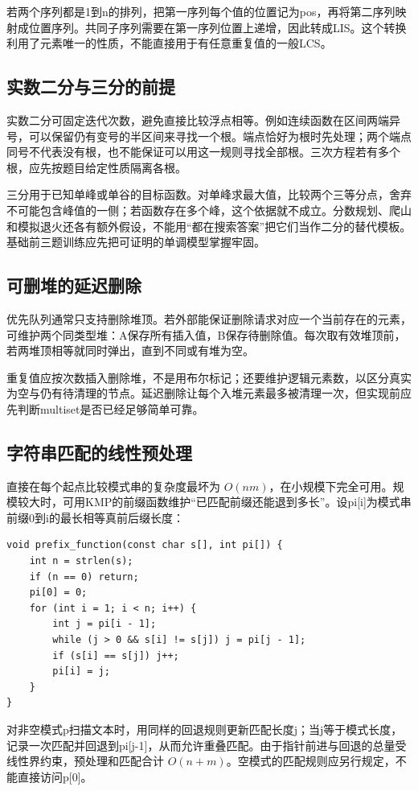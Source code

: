 若两个序列都是1到n的排列，把第一序列每个值的位置记为pos，再将第二序列映射成位置序列。共同子序列需要在第一序列位置上递增，因此转成LIS。这个转换利用了元素唯一的性质，不能直接用于有任意重复值的一般LCS。

\subsection{实数二分与三分的前提}
实数二分可固定迭代次数，避免直接比较浮点相等。例如连续函数在区间两端异号，可以保留仍有变号的半区间来寻找一个根。端点恰好为根时先处理；两个端点同号不代表没有根，也不能保证可以用这一规则寻找全部根。三次方程若有多个根，应先按题目给定性质隔离各根。

三分用于已知单峰或单谷的目标函数。对单峰求最大值，比较两个三等分点，舍弃不可能包含峰值的一侧；若函数存在多个峰，这个依据就不成立。分数规划、爬山和模拟退火还各有额外假设，不能用“都在搜索答案”把它们当作二分的替代模板。基础前三题训练应先把可证明的单调模型掌握牢固。

\subsection{可删堆的延迟删除}
优先队列通常只支持删除堆顶。若外部能保证删除请求对应一个当前存在的元素，可维护两个同类型堆：A保存所有插入值，B保存待删除值。每次取有效堆顶前，若两堆顶相等就同时弹出，直到不同或有堆为空。

重复值应按次数插入删除堆，不是用布尔标记；还要维护逻辑元素数，以区分真实为空与仍有待清理的节点。延迟删除让每个入堆元素最多被清理一次，但实现前应先判断multiset是否已经足够简单可靠。

\subsection{字符串匹配的线性预处理}
直接在每个起点比较模式串的复杂度最坏为 $O(nm)$，在小规模下完全可用。规模较大时，可用KMP的前缀函数维护“已匹配前缀还能退到多长”。设pi[i]为模式串前缀0到i的最长相等真前后缀长度：
\begin{lstlisting}
void prefix_function(const char s[], int pi[]) {
    int n = strlen(s);
    if (n == 0) return;
    pi[0] = 0;
    for (int i = 1; i < n; i++) {
        int j = pi[i - 1];
        while (j > 0 && s[i] != s[j]) j = pi[j - 1];
        if (s[i] == s[j]) j++;
        pi[i] = j;
    }
}
\end{lstlisting}
对非空模式p扫描文本时，用同样的回退规则更新匹配长度j；当j等于模式长度，记录一次匹配并回退到pi[j-1]，从而允许重叠匹配。由于指针前进与回退的总量受线性界约束，预处理和匹配合计 $O(n+m)$。空模式的匹配规则应另行规定，不能直接访问p[0]。

